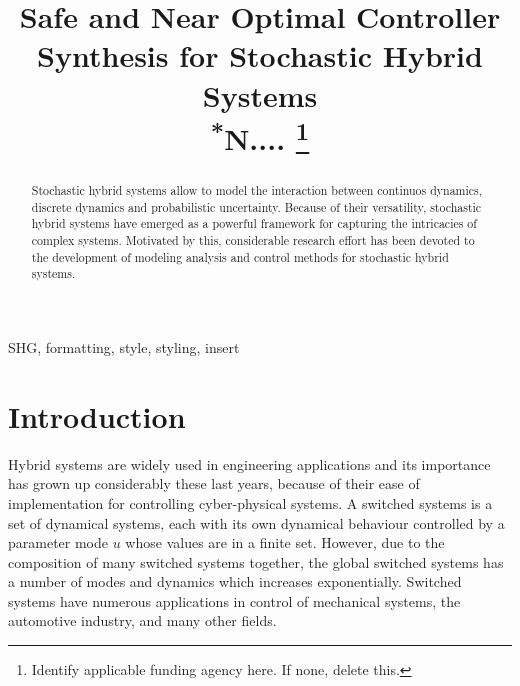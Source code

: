 \documentclass[conference]{IEEEtran}
\begin{document}
\title{Safe and Near Optimal Controller Synthesis for Stochastic Hybrid Systems\\
{\footnotesize \textsuperscript{*}N....}
\thanks{Identify applicable funding agency here. If none, delete this.}
}

\author{
\and
{}

}

\maketitle


\maketitle

\begin{abstract}
    Stochastic hybrid systems allow to model the interaction between continuos dynamics,
discrete dynamics and probabilistic uncertainty. Because of their versatility,
stochastic hybrid systems have emerged as a powerful framework for capturing 
the intricacies of complex systems. Motivated by this, considerable research effort 
has been devoted to the development of modeling analysis and control 
methods for stochastic hybrid systems. 

\end{abstract}

\begin{IEEEkeywords}
SHG, formatting, style, styling, insert
\end{IEEEkeywords}

\section{Introduction}
Hybrid systems are widely used in engineering applications and its 
importance has grown up considerably these last years, because of their 
ease of implementation for controlling cyber-physical systems.
A switched systems is a set of dynamical systems, each with its own 
dynamical behaviour controlled by a parameter mode $u$ whose values 
are in a finite set. However, due to the composition of many switched 
systems together, the global switched systems has a number of modes 
and dynamics which increases exponentially. Switched systems have 
numerous applications in control of mechanical systems, the automotive
 industry, and many other fields.
\end{document}
